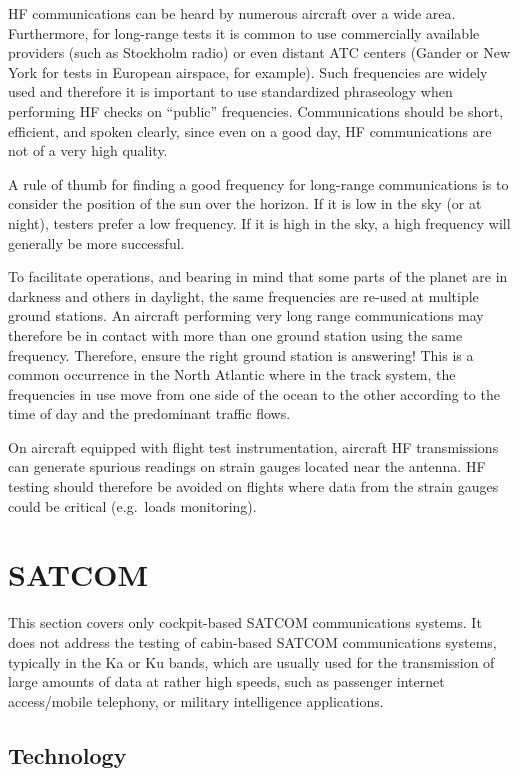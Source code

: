 \documentclass[
]{book}
\begin{document}
HF communications can be heard by numerous aircraft over a wide area.
Furthermore, for long-range tests it is common to use commercially available
providers (such as Stockholm radio) or even distant ATC centers (Gander or New
York for tests in European airspace, for example). Such frequencies are widely
used and therefore it is important to use standardized phraseology when
performing HF checks on ``public'' frequencies. Communications should be short,
efficient, and spoken clearly, since even on a good day, HF communications are
not of a very high quality.

A rule of thumb for finding a good frequency for long-range communications is
to consider the position of the sun over the horizon. If it is low in the sky
(or at night), testers prefer a low frequency. If it is high in the sky, a high
frequency will generally be more successful.

To facilitate operations, and bearing in mind that some parts of the planet are
in darkness and others in daylight, the same frequencies are re-used at
multiple ground stations. An aircraft performing very long range communications
may therefore be in contact with more than one ground station using the same
frequency. Therefore, ensure the right ground station is answering! This is a
common occurrence in the North Atlantic where in the track system, the
frequencies in use move from one side of the ocean to the other according to
the time of day and the predominant traffic flows.

On aircraft equipped with flight test instrumentation, aircraft HF
transmissions can generate spurious readings on strain gauges located near the
antenna. HF testing should therefore be avoided on flights where data from the
strain gauges could be critical (e.g.~loads monitoring).

\hypertarget{satcom}{%
\section{SATCOM}\label{satcom}}

This section covers only cockpit-based SATCOM communications systems. It does
not address the testing of cabin-based SATCOM communications systems, typically
in the Ka or Ku bands, which are usually used for the transmission of large
amounts of data at rather high speeds, such as passenger internet access/mobile
telephony, or military intelligence applications.

\hypertarget{technology-2}{%
\subsection{Technology}\label{technology-2}}
\end{document}
